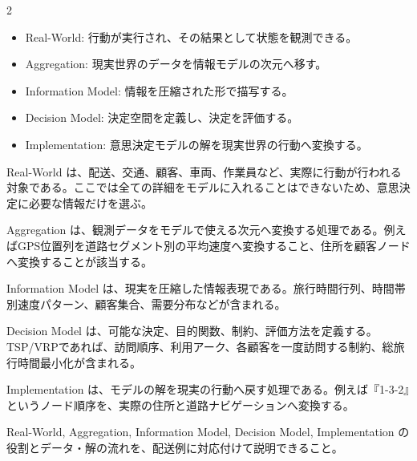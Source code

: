 
\vspace{1.5mm}

\begin{multicols}{2}

\footnotesize

\raggedcolumns


\begin{itemize}
\item Real-World: 行動が実行され、その結果として状態を観測できる。
\item Aggregation: 現実世界のデータを情報モデルの次元へ移す。
\item Information Model: 情報を圧縮された形で描写する。
\item Decision Model: 決定空間を定義し、決定を評価する。
\item Implementation: 意思決定モデルの解を現実世界の行動へ変換する。
\end{itemize}

Real-World は、配送、交通、顧客、車両、作業員など、実際に行動が行われる対象である。ここでは全ての詳細をモデルに入れることはできないため、意思決定に必要な情報だけを選ぶ。\par

Aggregation は、観測データをモデルで使える次元へ変換する処理である。例えばGPS位置列を道路セグメント別の平均速度へ変換すること、住所を顧客ノードへ変換することが該当する。\par

Information Model は、現実を圧縮した情報表現である。旅行時間行列、時間帯別速度パターン、顧客集合、需要分布などが含まれる。\par

Decision Model は、可能な決定、目的関数、制約、評価方法を定義する。TSP/VRPであれば、訪問順序、利用アーク、各顧客を一度訪問する制約、総旅行時間最小化が含まれる。\par

Implementation は、モデルの解を現実の行動へ戻す処理である。例えば『1-3-2』というノード順序を、実際の住所と道路ナビゲーションへ変換する。\par

Real-World, Aggregation, Information Model, Decision Model, Implementation の役割とデータ・解の流れを、配送例に対応付けて説明できること。\par


\end{multicols}

